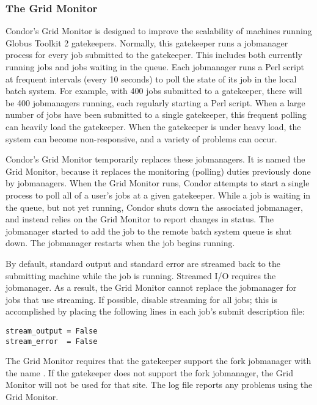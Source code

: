 \subsubsection{\label{sec:Condor-G-GridMonitor}The Grid Monitor}

Condor's Grid Monitor is designed to improve the scalability of
machines running Globus Toolkit 2 gatekeepers.
Normally, this gatekeeper runs a jobmanager process for 
every job submitted to the gatekeeper.
This includes both currently running jobs and jobs waiting in the queue.
Each jobmanager runs a Perl script at
frequent intervals (every 10 seconds) to poll the state of
its job in the local batch system.
For example, with 400 jobs submitted to a gatekeeper,
there will be 400 jobmanagers running,
each regularly starting a Perl script.
When a large number of jobs
have been submitted to a single gatekeeper,
this frequent polling can heavily load the gatekeeper.
When the gatekeeper is under heavy load,
the system can become non-responsive, and a variety of problems can occur.

Condor's Grid Monitor temporarily replaces these jobmanagers.
It is named the Grid Monitor, because it replaces the monitoring
(polling) duties previously done by jobmanagers.
When the Grid Monitor runs,
Condor attempts to start a single
process to poll all of a user's jobs at a given gatekeeper.
While a job is waiting in the queue, but not yet running,
Condor shuts down the associated jobmanager,
and instead relies on the Grid Monitor to report changes in status.
The jobmanager started to add the job to the remote
batch system queue is shut down.
The jobmanager restarts when the job begins running.

By default, standard output and standard error are streamed back
to the submitting machine while the job is running.
Streamed I/O requires the jobmanager.
As a result, the Grid Monitor cannot
replace the jobmanager for jobs that use streaming.
If possible,
disable streaming for all jobs;
this is accomplished by placing the
following lines in each job's submit description file:

\begin{verbatim}
stream_output = False
stream_error  = False
\end{verbatim}

The Grid Monitor requires that the gatekeeper support the fork
jobmanager with the name .
If the gatekeeper does not support the fork jobmanager,
the Grid Monitor will not be used for that site.
The  log file reports any problems
using the Grid Monitor.

